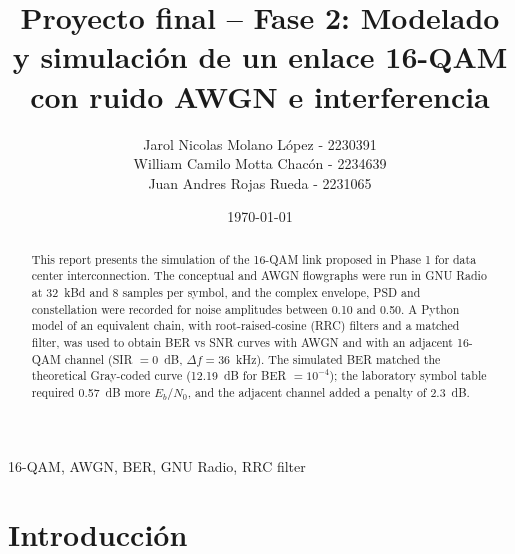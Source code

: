 \documentclass[twocolumn]{IEEEtran}
\newcommand{\dochead}{Proyecto final -- Fase 2}
\newcommand{\docsubhead}{Modelado y simulación de un enlace 16-QAM con ruido AWGN e interferencia}
\newcommand{\titulo}{\dochead: \docsubhead}
\begin{document}

\title{\vspace{1cm}\textbf{\titulo}}            %

\author{
Jarol Nicolas Molano López - 2230391 \\
William Camilo Motta Chacón - 2234639\\
Juan Andres Rojas Rueda - 2231065
}

\date{\today}

\maketitle                          %
\thispagestyle{fancy}               %


\begin{abstract}
This report presents the simulation of the 16-QAM link proposed in Phase 1 for data center interconnection. The conceptual and AWGN flowgraphs were run in GNU Radio at 32~kBd and 8 samples per symbol, and the complex envelope, PSD and constellation were recorded for noise amplitudes between 0.10 and 0.50. A Python model of an equivalent chain, with root-raised-cosine (RRC) filters and a matched filter, was used to obtain BER vs SNR curves with AWGN and with an adjacent 16-QAM channel (SIR $=0$~dB, $\Delta f = 36$~kHz). The simulated BER matched the theoretical Gray-coded curve (12.19~dB for BER $=10^{-4}$); the laboratory symbol table required 0.57~dB more $E_b/N_0$, and the adjacent channel added a penalty of 2.3~dB.
\end{abstract}

\begin{IEEEkeywords}
16-QAM, AWGN, BER, GNU Radio, RRC filter
\end{IEEEkeywords}

\section{Introducción}
\end{document}
